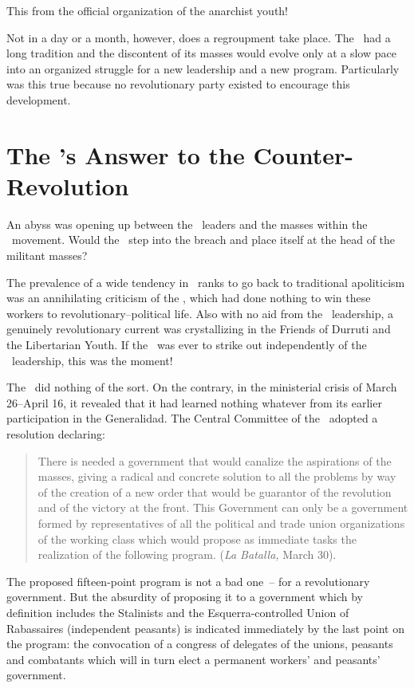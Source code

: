 This from the official organization of the anarchist youth!

\medskip

Not in a day or a month, however, does a regroupment take place. The \CNT\ had a long tradition and the discontent of its masses would evolve only at a slow pace into an organized struggle for a new leadership and a new program. Particularly was this true because no revolutionary party existed to encourage this development.

\section{The \POUM’s Answer to the Counter-Revolution}

An abyss was opening up between the \CNT\ leaders and the masses within the \CNT\ movement. Would the \POUM\ step into the breach and place itself at the head of the militant masses?

The prevalence of a wide tendency in \CNT\ ranks to go back to traditional apoliticism was an annihilating criticism of the \POUM\kn, which had done nothing to win these workers to revolutionary--political life. Also with no aid from the \POUM\ leadership, a genuinely revolutionary current was crystallizing in the Friends of Durruti and the Libertarian Youth. If the \POUM\ was ever to strike out independently of the \CNT\ leadership, this was the moment!

The \POUM\ did nothing of the sort. On the contrary, in the ministerial crisis of March 26--April 16, it revealed that it had learned nothing whatever from its earlier participation in the Generalidad. The Central Committee of the \POUM\ adopted a resolution declaring:

\begin{quotation}
  There is needed a government that would canalize the aspirations of the masses, giving a radical and concrete solution to all the problems by way of the creation of a new order that would be guarantor of the revolution and of the victory at the front. This Government can only be a government formed by representatives of all the political and trade union organizations of the working class which would propose as immediate tasks the realization of the following program. (\emph{La Batalla,} March 30).
\end{quotation}

The proposed fifteen-point program is not a bad one~-- for a revolutionary government. But the absurdity of proposing it to a government which by definition includes the Stalinists and the Esquerra-controlled Union of Rabassaires (independent peasants) is indicated immediately by the last point on the program: the convocation of a congress of delegates of the unions, peasants and combatants which will in turn elect a permanent workers’ and peasants’ government.

